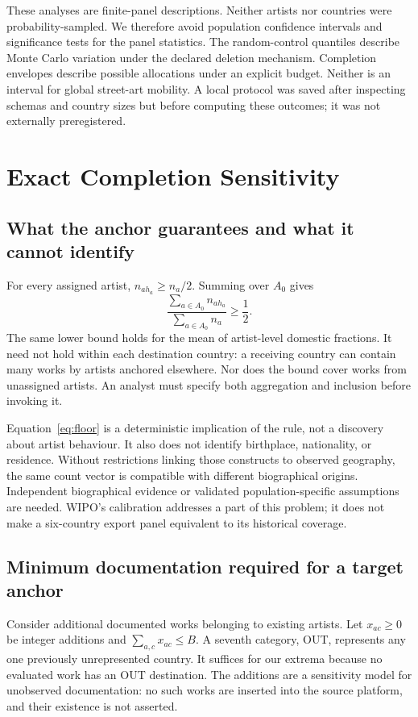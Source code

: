 These analyses are finite-panel descriptions. Neither artists nor countries were probability-sampled. We therefore avoid population confidence intervals and significance tests for the panel statistics. The random-control quantiles describe Monte Carlo variation under the declared deletion mechanism. Completion envelopes describe possible allocations under an explicit budget. Neither is an interval for global street-art mobility. A local protocol was saved after inspecting schemas and country sizes but before computing these outcomes; it was not externally preregistered.

\section{Exact Completion Sensitivity}
\subsection{What the anchor guarantees and what it cannot identify}
For every assigned artist, $n_{a h_a}\geq n_a/2$. Summing over $A_0$ gives
\begin{equation}
 \frac{\sum_{a\in A_0} n_{a h_a}}{\sum_{a\in A_0} n_a}\geq\frac12.
 \label{eq:floor}
\end{equation}
The same lower bound holds for the mean of artist-level domestic fractions. It need not hold within each destination country: a receiving country can contain many works by artists anchored elsewhere. Nor does the bound cover works from unassigned artists. An analyst must specify both aggregation and inclusion before invoking it.

Equation~\ref{eq:floor} is a deterministic implication of the rule, not a discovery about artist behaviour. It also does not identify birthplace, nationality, or residence. Without restrictions linking those constructs to observed geography, the same count vector is compatible with different biographical origins. Independent biographical evidence or validated population-specific assumptions are needed. WIPO's calibration addresses a part of this problem; it does not make a six-country export panel equivalent to its historical coverage.

\subsection{Minimum documentation required for a target anchor}
Consider additional documented works belonging to existing artists. Let $x_{ac}\geq0$ be integer additions and $\sum_{a,c}x_{ac}\leq B$. A seventh category, OUT, represents any one previously unrepresented country. It suffices for our extrema because no evaluated work has an OUT destination. The additions are a sensitivity model for unobserved documentation: no such works are inserted into the source platform, and their existence is not asserted.

